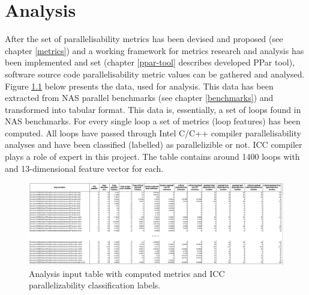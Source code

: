 \chapter{Analysis}


\null\qquad After the set of parallelisability metrics has been devised and proposed (see chapter \ref{metrics}) and a working framework for metrics research and analysis has been implemented and set (chapter \ref{ppar-tool} describes developed PPar tool), software source code parallelisability metric values can be gathered and analysed. \newline
\null\qquad Figure \ref{analysis-data-table} below presents the data, used for analysis. This data has been extracted from NAS parallel benchmarks (see chapter \ref{benchmarks}) and transformed into tabular format. This data is, essentially, a set of loops found in NAS benchmarks. For every single loop a set of metrics (loop features) has been computed. All loops have passed through Intel C/C++ compiler parallelisability analyses and have been classified (labelled) as parallelizible or not. ICC compiler plays a role of expert in this project. The table contains around 1400 loops with and 13-dimensional feature vector for each.  

\begin{figure}[htb]
	\centering
	\includegraphics[width=\linewidth]{figs/metrics-table.png}
	\caption{Analysis input table with computed metrics and ICC parallelizability classification labels.}
	\label{analysis-data-table}
\end{figure}

